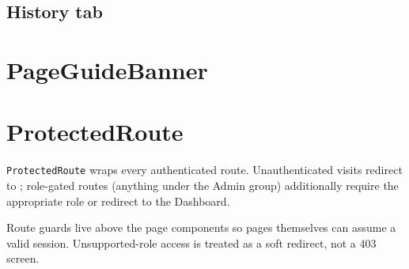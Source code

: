 \subsection{History tab}
\begin{itemize}
\end{itemize}

\section{PageGuideBanner}
\label{sec:app-shell-page-guide}


\begin{itemize}
\end{itemize}

\section{ProtectedRoute}
\label{sec:app-shell-protected-route}

\texttt{ProtectedRoute} wraps every authenticated route. Unauthenticated
visits redirect to ; role-gated routes (anything under the
Admin group) additionally require the appropriate role or redirect to
the Dashboard.

\begin{designnote}
Route guards live above the page components so pages themselves can
assume a valid session. Unsupported-role access is treated as a soft
redirect, not a 403 screen.
\end{designnote}
